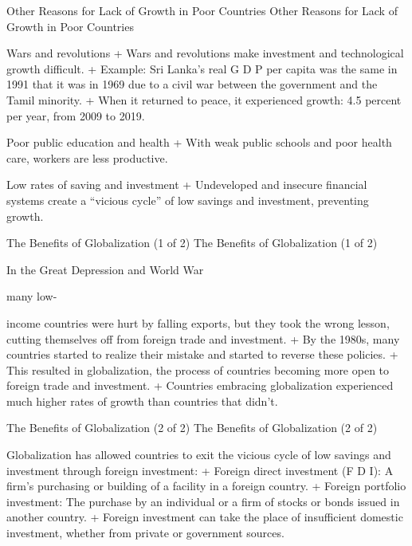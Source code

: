 \documentclass[
  12pt,
  ignorenonframetext,
]{beamer}
\begin{document}
\begin{frame}{Other Reasons for Lack of Growth in Poor Countries}
\protect\hypertarget{other-reasons-for-lack-of-growth-in-poor-countries}{}
Other Reasons for Lack of Growth in Poor Countries

Wars and revolutions + Wars and revolutions make investment and
technological growth difficult. + Example: Sri Lanka's real G D P per
capita was the same in 1991 that it was in 1969 due to a civil war
between the government and the Tamil minority. + When it returned to
peace, it experienced growth: 4.5 percent per year, from 2009 to 2019.

Poor public education and health + With weak public schools and poor
health care, workers are less productive.

Low rates of saving and investment + Undeveloped and insecure financial
systems create a ``vicious cycle'' of low savings and investment,
preventing growth.
\end{frame}

\begin{frame}{The Benefits of Globalization (1 of 2)}
\protect\hypertarget{the-benefits-of-globalization-1-of-2}{}
The Benefits of Globalization (1 of 2)

In the Great Depression and World War

many low-

income countries were hurt by falling exports, but they took the wrong
lesson, cutting themselves off from foreign trade and investment. + By
the 1980s, many countries started to realize their mistake and started
to reverse these policies. + This resulted in globalization, the process
of countries becoming more open to foreign trade and investment. +
Countries embracing globalization experienced much higher rates of
growth than countries that didn't.
\end{frame}

\begin{frame}{The Benefits of Globalization (2 of 2)}
\protect\hypertarget{the-benefits-of-globalization-2-of-2}{}
The Benefits of Globalization (2 of 2)

Globalization has allowed countries to exit the vicious cycle of low
savings and investment through foreign investment: + Foreign direct
investment (F D I): A firm's purchasing or building of a facility in a
foreign country. + Foreign portfolio investment: The purchase by an
individual or a firm of stocks or bonds issued in another country. +
Foreign investment can take the place of insufficient domestic
investment, whether from private or government sources.
\end{frame}
\end{document}
